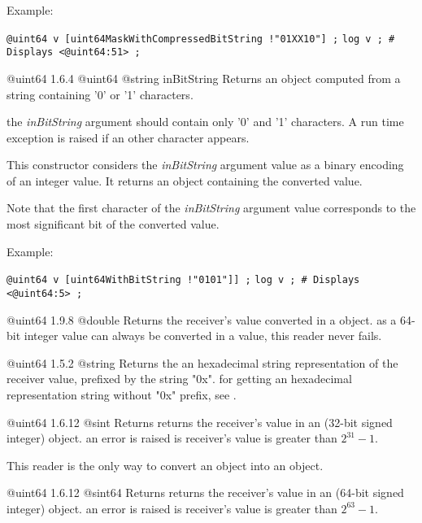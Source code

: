 Example:

\texttt{@uint64 v [uint64MaskWithCompressedBitString !"01XX10"] ;}\newline
\texttt{log v ; \# Displays <@uint64:51> ;}



{@uint64}
{1.6.4}
{@uint64}
{@string inBitString}
{Returns an  object computed from a string containing '0' or '1' characters.}
{the \emph{inBitString} argument should contain only '0' and '1' characters. A run time exception is raised if an other character appears.

This constructor considers the \emph{inBitString} argument value as a binary encoding of an integer value. It returns an  object containing the converted value.

Note that the first character of the \emph{inBitString} argument value corresponds to the most significant bit of the converted value.}

Example:

\texttt{@uint64 v [uint64WithBitString !"0101"]] ;}\newline
\texttt{log v ; \# Displays <@uint64:5> ;}




{@uint64}
{1.9.8}
{@double}
{Returns the receiver's value converted in a  object.}
{as a 64-bit integer value can always be converted in a  value, this reader never fails.}



{@uint64}
{1.5.2}
{@string}
{Returns the an hexadecimal string representation of the receiver value, prefixed by the string "0x".}
{for getting an hexadecimal representation string without "0x" prefix, see .}





{@uint64}
{1.6.12}
{@sint}
{Returns returns the receiver's value in an  (32-bit signed integer) object.}
{an error is raised is receiver's value is greater than $2^{31}-1$.}

This reader is the only way to convert an  object into an  object.




{@uint64}
{1.6.12}
{@sint64}
{Returns returns the receiver's value in an  (64-bit signed integer) object.}
{an error is raised is receiver's value is greater than $2^{63}-1$.}

